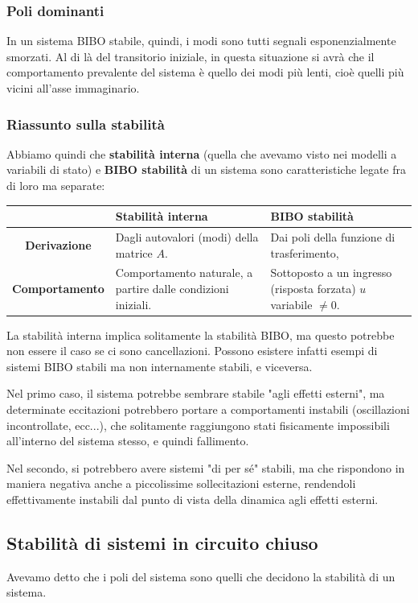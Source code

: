 \documentclass[a4paper,11pt]{article}
\begin{document}
\subsubsection{Poli dominanti}
In un sistema BIBO stabile, quindi, i modi sono tutti segnali esponenzialmente smorzati.
Al di là del transitorio iniziale, in questa situazione si avrà che il comportamento prevalente del sistema è quello dei modi più lenti, cioè quelli più vicini all'asse immaginario.

\subsubsection{Riassunto sulla stabilità}
Abbiamo quindi che \textbf{stabilità interna} (quella che avevamo visto nei modelli a variabili di stato) e \textbf{BIBO stabilità} di un sistema sono caratteristiche legate fra di loro ma separate:
\begin{table}[h!]
	\center {}
	\begin{tabular} { c || p{5cm} | p{5cm} }
	& \bfseries Stabilità interna & \bfseries BIBO stabilità \\ 
	\hline 
		\bfseries Derivazione & Dagli autovalori (modi) della matrice $A$. & Dai poli della funzione di trasferimento, \\ 
		\bfseries Comportamento & Comportamento naturale, a partire dalle condizioni iniziali. & Sottoposto a un ingresso (risposta forzata) $u$ variabile $\neq 0$.
	\end{tabular}
\end{table}

La stabilità interna implica solitamente la stabilità BIBO, ma questo potrebbe non essere il caso se ci sono cancellazioni.
Possono esistere infatti esempi di sistemi BIBO stabili ma non internamente stabili, e viceversa.

Nel primo caso, il sistema potrebbe sembrare stabile "agli effetti esterni", ma determinate eccitazioni potrebbero portare a comportamenti instabili (oscillazioni incontrollate, ecc...), che solitamente raggiungono stati fisicamente 
impossibili all'interno del sistema stesso, e quindi fallimento.

Nel secondo, si potrebbero avere sistemi "di per sé" stabili, ma che rispondono in maniera negativa anche a piccolissime sollecitazioni esterne, rendendoli effettivamente instabili dal punto di vista della dinamica agli effetti esterni.

\subsection{Stabilità di sistemi in circuito chiuso}
Avevamo detto che i poli del sistema sono quelli che decidono la stabilità di un sistema.
\end{document}
